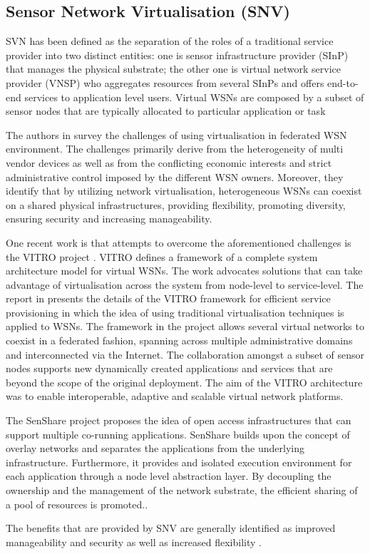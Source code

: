 \subsection{Sensor Network Virtualisation (SNV)}
SVN has been defined \cite{islam2012survey,citeulike:8979174} as the separation of the roles of a traditional service provider into two distinct entities: one is sensor infrastructure provider (SInP) that manages the physical substrate; the other one is virtual network service provider (VNSP) who aggregates resources from several SInPs and offers end-to-end services to application level users. Virtual WSNs are composed by a subset of sensor nodes that are typically allocated to particular application or task \cite{Lim:2009:VFH:1644038.1644080}

The authors in \cite{islam2012virtualization} survey the challenges of using virtualisation in federated WSN environment. The challenges primarily derive from the heterogeneity of multi vendor devices as well as from the conflicting economic interests and strict administrative control imposed by the different WSN owners. Moreover, they identify that by utilizing network virtualisation, heterogeneous WSNs can coexist on a shared physical infrastructures, providing flexibility, promoting diversity, ensuring security and increasing manageability.

One recent work is that attempts to overcome the aforementioned challenges is the VITRO project \cite{6076694}. VITRO defines a framework of a complete system architecture model for virtual WSNs. The work advocates solutions that can take advantage of virtualisation across the system from node-level to service-level. The report in \cite{sarakis2012framework} presents the details of the VITRO framework for efficient service provisioning in which the idea of using traditional virtualisation techniques is applied to WSNs. The framework in the project allows several virtual networks to coexist in a federated fashion, spanning across multiple administrative domains and interconnected via the Internet. The collaboration amongst a subset of sensor nodes supports new dynamically created applications and services that are beyond the scope of the original deployment. The aim of the VITRO architecture was to enable interoperable, adaptive and scalable virtual network platforms. 

The SenShare \cite{FRESnel_multi_application_WSN} project proposes the idea of open access infrastructures that can support multiple co-running applications. SenShare builds upon the concept of overlay networks and separates the applications from the underlying infrastructure. Furthermore, it provides and isolated execution environment for each application through a node level abstraction layer. By decoupling the ownership and the management of the network substrate, the efficient sharing of a pool of resources is promoted..
 
The benefits that are provided by SNV are generally identified as improved manageability and security as well as increased flexibility \cite{Chowdhury2009Network}.